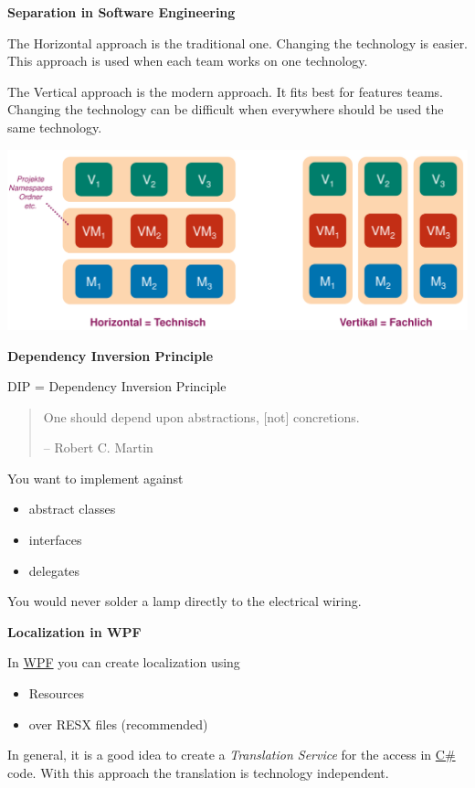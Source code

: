 \documentclass[10pt,twoside,landscape]{article}
\begin{document}
\begin{multicols}{4}
\textbf{Separation in Software Engineering}

The Horizontal approach is the traditional one.
Changing the technology is easier.
This approach is used when each team works on one technology.

The Vertical approach is the modern approach.
It fits best for features teams.
Changing the technology can be difficult when everywhere should be used the same technology.

\begin{center}
\includegraphics[width=.9\linewidth]{img/horizontal_vertical_cuts.png}
\end{center}

\textbf{Dependency Inversion Principle}

DIP = Dependency Inversion Principle

\begin{quote}
One should depend upon
abstractions, [not] concretions.

-- Robert C. Martin
\end{quote}

You want to implement against
\begin{itemize}
\item abstract classes
\item interfaces
\item delegates
\end{itemize}


You would never solder a lamp directly to the electrical wiring.

\textbf{Localization in WPF}

In \href{../../../roam/20211123162923-wpf.org}{WPF} you can create localization using
\begin{itemize}
\item Resources
\item over RESX files (recommended)
\end{itemize}


In general, it is a good idea to create a \emph{Translation Service} for the access in \href{../../../roam/20211003114158-c.org}{C\#} code.
With this approach the translation is technology independent.


\end{multicols}
\end{document}
